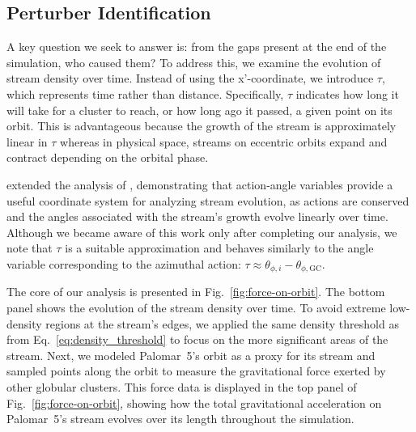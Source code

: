 \documentclass[draft]{aa}
\begin{document}
\begin{appendix}
  \section{Perturber Identification} \label{sec:Perturber_Identification}

    A key question we seek to answer is: from the gaps present at the end of the simulation, who caused them? To address this, we examine the evolution of stream density over time. Instead of using the x'-coordinate, we introduce $\tau$, which represents time rather than distance. Specifically, $\tau$ indicates how long it will take for a cluster to reach, or how long ago it passed, a given point on its orbit. This is advantageous because the growth of the stream is approximately linear in $\tau$ whereas in physical space, streams on eccentric orbits expand and contract depending on the orbital phase.


    \citet{2016MNRAS.457.3817S} extended the analysis of \citet{2015MNRAS.450.1136E}, demonstrating that action-angle variables provide a useful coordinate system for analyzing stream evolution, as actions are conserved and the angles associated with the stream's growth evolve linearly over time. Although we became aware of this work only after completing our analysis, we note that $\tau$ is a suitable approximation and behaves similarly to the angle variable corresponding to the azimuthal action: $\tau \approx \theta_{\phi,i} - \theta_{\phi,\text{GC}}$.

    The core of our analysis is presented in Fig.~\ref{fig:force-on-orbit}. The bottom panel shows the evolution of the stream density over time. To avoid extreme low-density regions at the stream's edges, we applied the same density threshold as from Eq.~\ref{eq:density_threshold} to focus on the more significant areas of the stream. Next, we modeled Palomar~5's orbit as a proxy for its stream and sampled points along the orbit to measure the gravitational force exerted by other globular clusters. This force data is displayed in the top panel of Fig.~\ref{fig:force-on-orbit}, showing how the total gravitational acceleration on Palomar~5's stream evolves over its length throughout the simulation.


\end{appendix}
\end{document}
